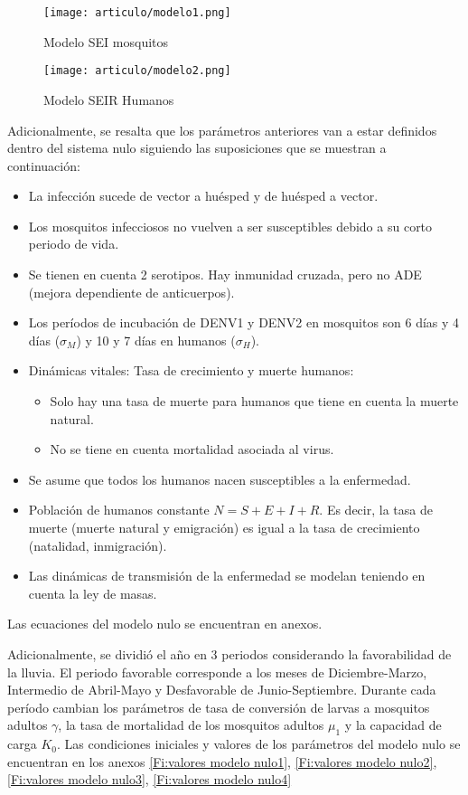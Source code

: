 \documentclass[journal]{IEEEtran}
\begin{document}
\begin{figure}[H]
\centering
\texttt{[image: articulo/modelo1.png]}
\caption{Modelo SEI mosquitos}
\label{fig:modelo1}
\centering
\end{figure}


\begin{figure}[H]
\centering
\texttt{[image: articulo/modelo2.png]}
\caption{Modelo SEIR Humanos}
\label{fig:modelo2}
\centering
\end{figure}

Adicionalmente, se resalta que los parámetros anteriores van a estar definidos dentro del sistema nulo siguiendo las suposiciones que se muestran a continuación:
\begin{itemize}
    \item La infección sucede de vector a huésped y de huésped a vector.  
    \item Los mosquitos infecciosos no vuelven a ser susceptibles debido a su corto periodo de vida. 
    \item Se tienen en cuenta 2 serotipos. Hay inmunidad cruzada, pero no ADE (mejora dependiente de anticuerpos).
    \item Los períodos de incubación de DENV1 y DENV2 en mosquitos son 6 días y 4 días ($\sigma_M$) y 10 y 7 días en humanos ($\sigma_H$).
    \item Dinámicas vitales: Tasa de crecimiento y muerte humanos:
    \begin{itemize}
      \item{Solo hay una tasa de muerte para humanos que tiene en cuenta la muerte natural.}
      \item{No se tiene en cuenta mortalidad asociada al virus.}
    \end{itemize}
    \item Se asume que todos los humanos nacen susceptibles a la enfermedad.
    \item Población de humanos constante $N=S+E+I+R$. Es decir, la tasa de muerte (muerte natural y emigración) es igual a la tasa de crecimiento (natalidad, inmigración).
    \item Las dinámicas de transmisión de la enfermedad se modelan teniendo en cuenta la ley de masas.
\end{itemize}

Las ecuaciones del modelo nulo se encuentran en anexos.

Adicionalmente, se dividió el año en 3 periodos considerando la favorabilidad de la lluvia. El periodo favorable corresponde a los meses de Diciembre-Marzo, Intermedio de Abril-Mayo y Desfavorable de Junio-Septiembre. Durante cada período cambian los parámetros de tasa de conversión de larvas a mosquitos adultos $\gamma$, la tasa de mortalidad de los mosquitos adultos $\mu_1$ y la capacidad de carga $K_{0}$. Las condiciones iniciales y valores de los parámetros del modelo nulo se encuentran en los anexos \ref{Fi:valores modelo nulo1}, \ref{Fi:valores modelo nulo2}, \ref{Fi:valores modelo nulo3}, \ref{Fi:valores modelo nulo4} 
\end{document}
